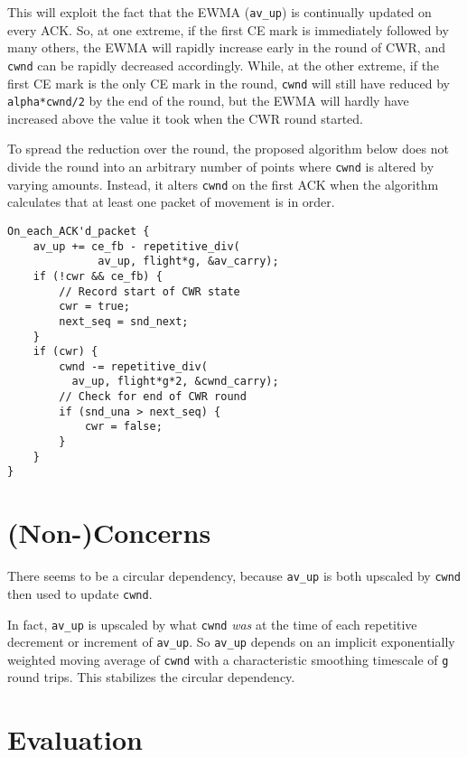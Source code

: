 This will exploit the fact that the EWMA (\texttt{av\_up}) is continually updated on every ACK. So, at one extreme, if the first CE mark is immediately followed by many others, the EWMA will rapidly increase early in the round of CWR, and \texttt{cwnd} can be rapidly decreased accordingly. While, at the other extreme, if the first CE mark is the only CE mark in the round, \texttt{cwnd} will still have reduced by \texttt{alpha*cwnd/2} by the end of the round, but the EWMA will hardly have increased above the value it took when the CWR round started.

To spread the reduction over the round, the proposed algorithm below does not divide the round into an arbitrary number of points where \texttt{cwnd} is altered by varying amounts. Instead, it alters \texttt{cwnd} on the first ACK when the algorithm calculates that at least one packet of movement is in order. 


\begin{verbatim}
On_each_ACK'd_packet {
    av_up += ce_fb - repetitive_div(
              av_up, flight*g, &av_carry);
    if (!cwr && ce_fb) {
        // Record start of CWR state
        cwr = true;
        next_seq = snd_next;
    }
    if (cwr) {
        cwnd -= repetitive_div(
          av_up, flight*g*2, &cwnd_carry);
        // Check for end of CWR round
        if (snd_una > next_seq) {
            cwr = false;
        }
    }
}

\end{verbatim}


\section{(Non-)Concerns}\label{prresp_Non-Concerns}

There seems to be a circular dependency, because \texttt{av\_up} is both upscaled by \texttt{cwnd} then used to update \texttt{cwnd}.

In fact, \texttt{av\_up} is upscaled by what \texttt{cwnd} \emph{was} at the time of each repetitive decrement or increment of \texttt{av\_up}. So  \texttt{av\_up} depends on an implicit exponentially weighted moving average of \texttt{cwnd} with a characteristic smoothing timescale of \texttt{g} round trips. This stabilizes the circular dependency.

\section{Evaluation}\label{prresp_Evaluation}

